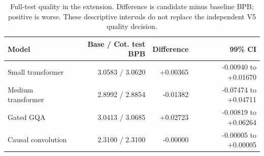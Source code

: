 \documentclass[11pt]{article}
\begin{document}
\begin{table}[H]
\centering
\small
\begin{tabular}{@{}lrrr@{}}
\toprule
Model & Base / Cot. test BPB & Difference & 99\% CI\\
\midrule
Small transformer & 3.0583 / 3.0620 & +0.00365 & -0.00940 to +0.01670 \\
Medium transformer & 2.8992 / 2.8854 & -0.01382 & -0.07474 to +0.04711 \\
Gated GQA & 3.0413 / 3.0685 & +0.02723 & -0.00819 to +0.06264 \\
Causal convolution & 2.3100 / 2.3100 & -0.00000 & -0.00005 to +0.00005 \\
\bottomrule
\end{tabular}
\caption{Full-test quality in the extension. Difference is candidate minus
baseline BPB; positive is worse. These descriptive intervals do not replace
the independent V5 quality decision.}
\label{tab:quality}
\end{table}
\end{document}

